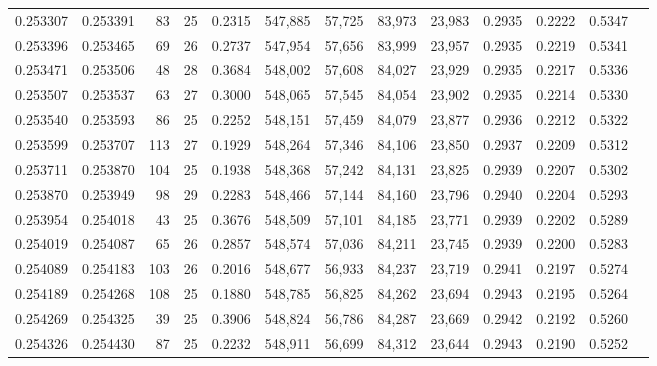 \begin{tabular}{rrrrrrrrrrrrr}
0.253307 & 0.253391 &  83 &  25 &                                     0.2315 & 547,885 &  57,725 &  83,973 &  23,983 & 0.2935 & 0.2222 & 0.5347 \\
0.253396 & 0.253465 &  69 &  26 &                                     0.2737 & 547,954 &  57,656 &  83,999 &  23,957 & 0.2935 & 0.2219 & 0.5341 \\
0.253471 & 0.253506 &  48 &  28 &                                     0.3684 & 548,002 &  57,608 &  84,027 &  23,929 & 0.2935 & 0.2217 & 0.5336 \\
0.253507 & 0.253537 &  63 &  27 &                                     0.3000 & 548,065 &  57,545 &  84,054 &  23,902 & 0.2935 & 0.2214 & 0.5330 \\
0.253540 & 0.253593 &  86 &  25 &                                     0.2252 & 548,151 &  57,459 &  84,079 &  23,877 & 0.2936 & 0.2212 & 0.5322 \\
0.253599 & 0.253707 & 113 &  27 &                                     0.1929 & 548,264 &  57,346 &  84,106 &  23,850 & 0.2937 & 0.2209 & 0.5312 \\
0.253711 & 0.253870 & 104 &  25 &                                     0.1938 & 548,368 &  57,242 &  84,131 &  23,825 & 0.2939 & 0.2207 & 0.5302 \\
0.253870 & 0.253949 &  98 &  29 &                                     0.2283 & 548,466 &  57,144 &  84,160 &  23,796 & 0.2940 & 0.2204 & 0.5293 \\
0.253954 & 0.254018 &  43 &  25 &                                     0.3676 & 548,509 &  57,101 &  84,185 &  23,771 & 0.2939 & 0.2202 & 0.5289 \\
0.254019 & 0.254087 &  65 &  26 &                                     0.2857 & 548,574 &  57,036 &  84,211 &  23,745 & 0.2939 & 0.2200 & 0.5283 \\
0.254089 & 0.254183 & 103 &  26 &                                     0.2016 & 548,677 &  56,933 &  84,237 &  23,719 & 0.2941 & 0.2197 & 0.5274 \\
0.254189 & 0.254268 & 108 &  25 &                                     0.1880 & 548,785 &  56,825 &  84,262 &  23,694 & 0.2943 & 0.2195 & 0.5264 \\
0.254269 & 0.254325 &  39 &  25 &                                     0.3906 & 548,824 &  56,786 &  84,287 &  23,669 & 0.2942 & 0.2192 & 0.5260 \\
0.254326 & 0.254430 &  87 &  25 &                                     0.2232 & 548,911 &  56,699 &  84,312 &  23,644 & 0.2943 & 0.2190 & 0.5252 \\

\end{tabular}

